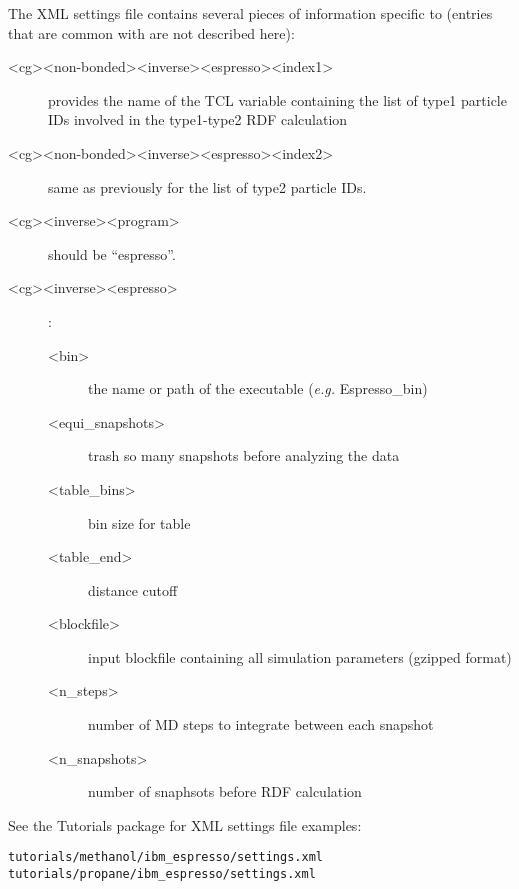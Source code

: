 The XML settings file contains several pieces of information specific to
\espresso (entries that are common with \gromacs are not described here):
\begin{description}
\item[<cg><non-bonded><inverse><espresso><index1>] provides the name of the
  TCL variable containing the list of type1 particle IDs involved in the
  type1-type2 RDF calculation
\item[<cg><non-bonded><inverse><espresso><index2>] same as previously for the
  list of type2 particle IDs.
\item[<cg><inverse><program>] should be ``espresso''.
\item[<cg><inverse><espresso>] :
  \begin{description}
  \item[<bin>] the name or path of the executable (\emph{e.g.} Espresso\_bin)
  \item[<equi\_snapshots>] trash so many snapshots before analyzing the data
  \item[<table\_bins>] bin size for table
  \item[<table\_end>] distance cutoff
  \item[<blockfile>] input blockfile containing all simulation parameters
    (gzipped format)
  \item[<n\_steps>] number of MD steps to integrate between each snapshot
  \item[<n\_snapshots>] number of snaphsots before RDF calculation
  \end{description}
\end{description}
See the Tutorials package for XML settings file examples:
\begin{verbatim}
tutorials/methanol/ibm_espresso/settings.xml
tutorials/propane/ibm_espresso/settings.xml
\end{verbatim}



